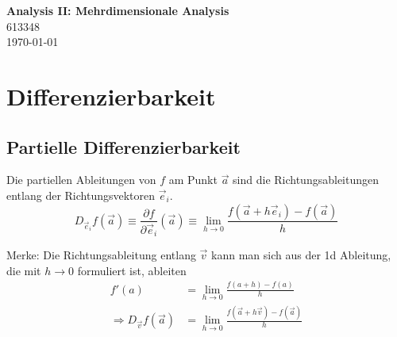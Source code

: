 \documentclass{article}
\begin{document}
\begin{center}
	\Large{\textbf{Analysis II: Mehrdimensionale Analysis}}\\
	\small{613348}\\
	\small{\today}
\end{center}

\tableofcontents


\newpage


\section{Differenzierbarkeit}
\subsection{Partielle Differenzierbarkeit}
Die partiellen Ableitungen von $f$ am Punkt $\vec{a}$ sind die Richtungsableitungen entlang der Richtungsvektoren $\vec{e}_i$.
	\begin{equation}
		D_{\vec{e}_i}f(\vec{a}) \equiv \frac{\partial f}{\partial \vec{e}_i}(\vec{a}) \equiv \lim\limits_{h\to 0} \frac{f(\vec{a} + h \vec{e}_i) - f(\vec{a})}{h}
	\end{equation}

{\color{gruen} Merke: Die Richtungsableitung entlang $\vec{v}$ kann man sich aus der 1d Ableitung, die mit $h\to 0$ formuliert ist, ableiten
	\begin{align*}
		f'(a) &= \lim\limits_{h\to 0} \frac{f(a+h) - f(a)}{h} \\
		\Rightarrow D_{\vec{v}}f(\vec{a}) &= \lim\limits_{h\to 0} \frac{f(\vec{a} + h\vec{v}) - f(\vec{a})}{h}
	\end{align*}
}
\end{document}

